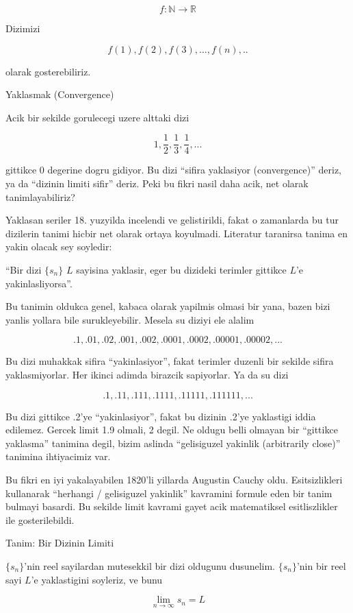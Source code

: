 \documentclass[12pt,fleqn]{article}
\begin{document}
\[ f: \mathbb{N} \to \mathbb{R} \]

Dizimizi 

\[ f(1),f(2),f(3),...,f(n),.. \]

olarak gosterebiliriz. 

Yaklasmak (Convergence) 

Acik bir sekilde gorulecegi uzere alttaki dizi

\[ 1,\frac{1}{2},\frac{1}{3},\frac{1}{4},... \]

gittikce 0 degerine dogru gidiyor. Bu dizi ``sifira yaklasiyor
(convergence)'' deriz, ya da ``dizinin limiti sifir'' deriz. Peki bu fikri
nasil daha acik, net olarak tanimlayabiliriz? 

Yaklasan seriler 18. yuzyilda incelendi ve gelistirildi, fakat o zamanlarda
bu tur dizilerin tanimi hicbir net olarak ortaya koyulmadi. Literatur
taranirsa tanima en yakin olacak sey soyledir:

``Bir dizi $\{s_n\}$ $L$ sayisina yaklasir, eger bu dizideki terimler
gittikce $L$'e yakinlasliyorsa''. 

Bu tanimin oldukca genel, kabaca olarak yapilmis olmasi bir yana, bazen
bizi yanlis yollara bile surukleyebilir. Mesela su diziyi ele alalim 

\[ .1, .01, .02, .001, .002, .0001, .0002, .00001, .00002, ... \]

Bu dizi muhakkak sifira ``yakinlasiyor'', fakat terimler duzenli bir sekilde
sifira yaklasmiyorlar. Her ikinci adimda birazcik sapiyorlar. Ya da su dizi

\[ .1, .11, .111, .1111, .11111, .111111, ... \]

Bu dizi gittikce .2'ye ``yakinlasiyor'', fakat bu dizinin .2'ye yaklastigi
iddia edilemez. Gercek limit 1.9 olmali, 2 degil. Ne oldugu belli olmayan
bir ``gittikce yaklasma'' tanimina degil, bizim aslinda ``gelisiguzel
yakinlik (arbitrarily close)'' tanimina ihtiyacimiz var.

Bu fikri en iyi yakalayabilen 1820'li yillarda Augustin Cauchy
oldu. Esitsizlikleri kullanarak ``herhangi / gelisiguzel yakinlik''
kavramini formule eden bir tanim bulmayi basardi. Bu sekilde limit kavrami
gayet acik matematiksel esitliszlikler ile gosterilebildi.

Tanim: Bir Dizinin Limiti 

$\{s_n\}$'nin reel sayilardan mutesekkil bir dizi oldugunu
dusunelim. $\{s_n\}$'nin bir reel sayi $L$'e yaklastigini soyleriz, ve bunu

\[ \lim_{n\to\infty} s_n = L \]
\end{document}
